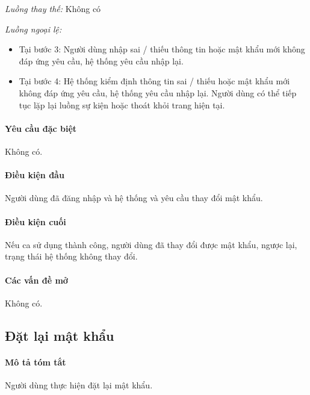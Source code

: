 \documentclass[./../main.tex]{subfiles}
\begin{document}
\emph{Luồng thay thế:} Không có

\emph{Luồng ngoại lệ:}

\begin{itemize}
\item
  
  Tại bước 3: Người dùng nhập sai / thiếu thông tin hoặc mật khẩu mới
  không đáp ứng yêu cầu, hệ thống yêu cầu nhập lại.
  
\item
  
  Tại bước 4: Hệ thống kiểm định thông tin sai / thiếu hoặc mật khẩu mới
  không đáp ứng yêu cầu, hệ thống yêu cầu nhập lại. Người dùng có thể
  tiếp tục lặp lại luồng sự kiện hoặc thoát khỏi trang hiện tại.
  
\end{itemize}

\paragraph*{Yêu cầu đặc biệt}

Không có.

\paragraph*{Điều kiện đầu}

Người dùng đã đăng nhập và hệ thống và yêu cầu thay đổi mật khẩu.

\paragraph*{Điều kiện cuối}

Nếu ca sử dụng thành công, người dùng đã thay đổi được mật khẩu, ngược
lại, trạng thái hệ thống không thay đổi.

\paragraph*{Các vấn đề mở}

Không có.

\subsection{Đặt lại mật khẩu}
\paragraph*{Mô tả tóm tắt}

Người dùng thực hiện đặt lại mật khẩu.
\end{document}
